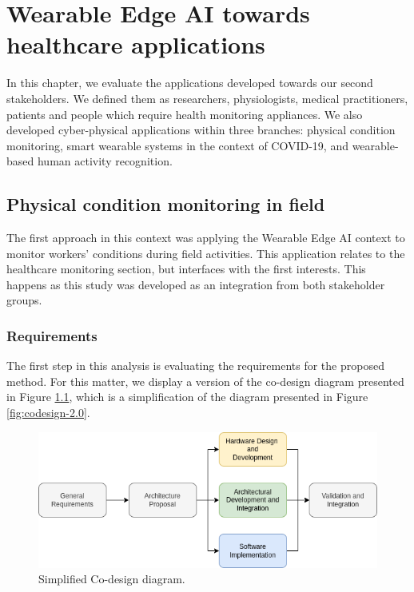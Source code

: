 \chapter{Wearable Edge AI towards healthcare applications}
\label{chap:healthcare}


In this chapter, we evaluate the applications developed towards our second stakeholders. We defined them as researchers, physiologists, medical practitioners, patients and people which require health monitoring appliances. We also developed cyber-physical applications within three branches: physical condition monitoring, smart wearable systems in the context of COVID-19, and wearable-based human activity recognition.

\section{Physical condition monitoring in field}

The first approach in this context was applying the Wearable Edge AI context to monitor workers' conditions during field activities. This application relates to the healthcare monitoring section, but interfaces with the first interests. This happens as this study was developed as an integration from both stakeholder groups.

\subsection{Requirements}

The first step in this analysis is evaluating the requirements for the proposed method. For this matter, we display a version of the co-design diagram presented in Figure \ref{fig:simplified-codesign-4}, which is a simplification of the diagram presented in Figure \ref{fig:codesign-2.0}. 

\begin{figure}[ht!]
    \centering
    \includegraphics[width = .8\linewidth]{Figures/simplified-codesign.png}
    \caption{Simplified Co-design diagram.}
    \label{fig:simplified-codesign-4}
\end{figure}

